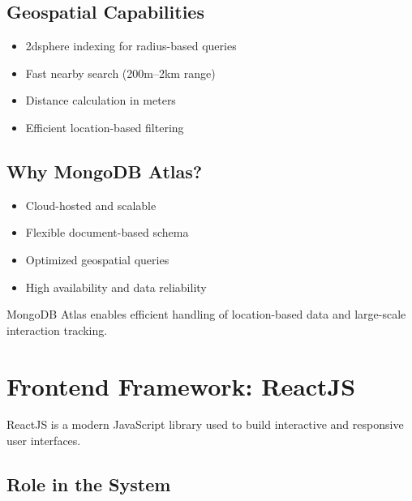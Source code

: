 \documentclass[12pt,a4paper]{report}
\begin{document}
\subsection*{Geospatial Capabilities}

\begin{itemize}

\item 2dsphere indexing for radius-based queries

\item Fast nearby search (200m--2km range)

\item Distance calculation in meters

\item Efficient location-based filtering

\end{itemize}

\subsection*{Why MongoDB Atlas?}

\begin{itemize}

\item Cloud-hosted and scalable

\item Flexible document-based schema

\item Optimized geospatial queries

\item High availability and data reliability

\end{itemize}

MongoDB Atlas enables efficient handling of location-based data and large-scale interaction tracking.

\section{Frontend Framework: ReactJS}

ReactJS is a modern JavaScript library used to build interactive and responsive user interfaces.

\subsection*{Role in the System}
\end{document}
